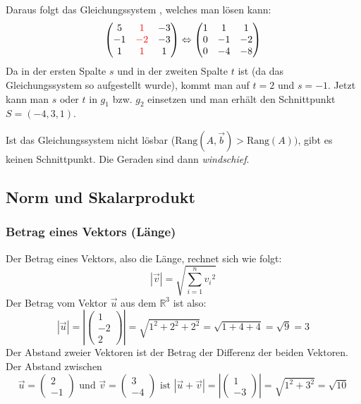 Daraus folgt das Gleichungssystem ,
welches man lösen kann:
\[ \begin {pmatrix}
  5 & \color{red}{1} & -3 \\
  -1 & \color{red}{-2} & -3 \\
  1 & \color{red}{1} & 1 \\
\end {pmatrix} \Leftrightarrow \begin {pmatrix}
  1 & 1 & 1 \\
  0 & -1 & -2 \\
  0 & -4 & -8 \\
\end {pmatrix} \]
Da in der ersten Spalte $s$ und in der zweiten Spalte $t$ ist (da das
Gleichungssystem so aufgestellt wurde), kommt man auf $t = 2$ und $s =
-1$. Jetzt kann man $s$ oder $t$ in $g_1$ bzw. $g_2$ einsetzen und man
erhält den Schnittpunkt $S = (-4, 3, 1)$.

Ist das Gleichungssystem nicht lösbar ($\text{Rang}(A,\vec{b}) >
\text{Rang}(A))$, gibt es keinen Schnittpunkt. Die Geraden sind dann
\emph{windschief}.

\subsection{Norm und Skalarprodukt}
\subsubsection{Betrag eines Vektors (Länge)}
Der Betrag eines Vektors, also die Länge, rechnet sich wie folgt:
\[ |\vec{v}| = \sqrt{\sum \limits_{i = 1}^n {v_i}^2} \]
Der Betrag vom Vektor $\vec{u}$ aus dem $\mathbb{R}^3$ ist also:
\[ |\vec{u}| = \left|\left( \begin{array}{c} 1 \\-2 \\2 \end{array}
\right)\right| = \sqrt{1^2 + 2^2 + 2^2} = \sqrt{1 + 4 + 4} = \sqrt{9} = 3 \]
Der Abstand zweier Vektoren ist der Betrag der Differenz der beiden
Vektoren. Der Abstand zwischen 
\[ \vec{u} = \left( \begin{array}{c} 2 \\ -1 \end{array}\right)
\text{ und } \vec{v} = \left( \begin{array}{c} 3 \\ -4 \end{array}\right)
\text{ ist } |\vec{u} + \vec{v}| = \left|\left(\begin{array}{c} 1 \\ -3
\end{array}\right)\right| = \sqrt{1^2 + 3^2} = \sqrt{10} \]

